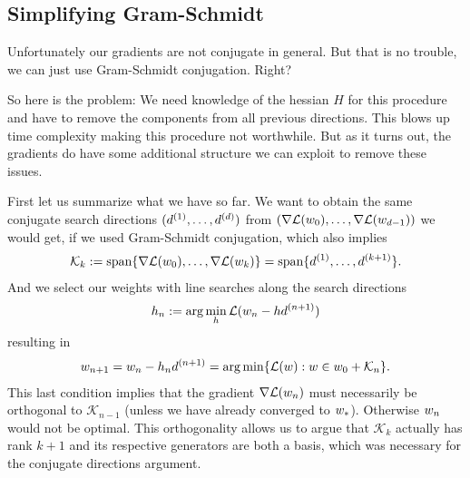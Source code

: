 \subsection{Simplifying Gram-Schmidt}

Unfortunately our gradients are not conjugate in general. But that is no
trouble, we can just use Gram-Schmidt conjugation. Right?

So here is the problem: We need knowledge of the hessian \(H\) for this
procedure and have to remove the components from all previous directions. This
blows up time complexity making this procedure not worthwhile. But as it turns
out, the gradients do have some additional structure we can exploit to remove
these issues.

First let us summarize what we have so far. We want to obtain the same conjugate
search directions \((d^{(1)},\dots,d^{(d)})\) from
\((\nabla\mathcal{L}(w_0),\dots,\nabla\mathcal{L}(w_{d-1}))\)
we would get, if we used Gram-Schmidt conjugation, which also implies
\begin{align*}
	\mathcal{K}_k := \text{span}\{\nabla\mathcal{L}(w_0),\dots,\nabla\mathcal{L}(w_k)\}
	= \text{span}\{d^{(1)},\dots,d^{(k+1)}\}.
\end{align*}
And we select our weights with line searches along the search directions
\begin{align*}
	h_n := \arg\min_h \mathcal{L}(w_n - h d^{(n+1)})
\end{align*}
resulting in
\begin{align*}
	w_{n+1} = w_n - h_n d^{(n+1)}
	= \arg\min\{ \mathcal{L}(w) : w\in w_0 + \mathcal{K}_n\}.
\end{align*}
This last condition implies that the gradient \(\nabla\mathcal{L}(w_n)\)
must necessarily be orthogonal to \(\mathcal{K}_{n-1}\) (unless we have already
converged to \(w_*\)). Otherwise \(w_n\) would not be optimal. This
orthogonality allows us to argue that \(\mathcal{K}_k\) actually has rank
\(k+1\) and its respective generators are both a basis, which was necessary for the
conjugate directions argument.


